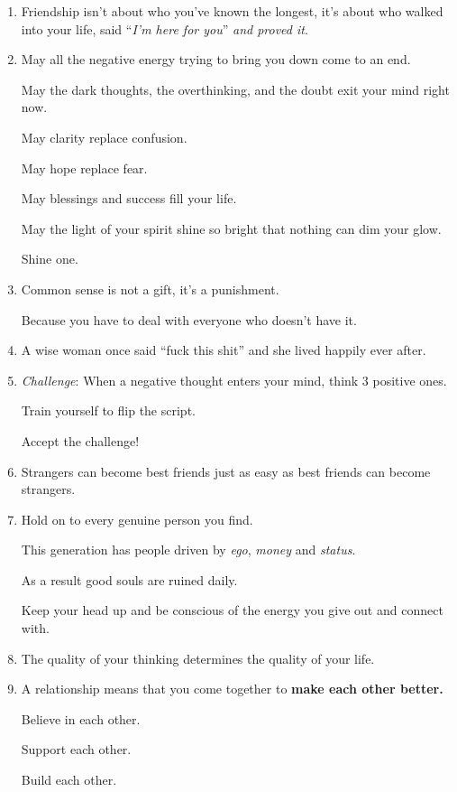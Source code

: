 \documentclass{article}
\numberwithin{equation}{section}
\begin{document}
\begin{enumerate}
    \textit{You'll make sacrifices}.'' - R. Solo
    \item Friendship isn't about who you've known the longest, it's about who walked into your life, said ``\textit{I'm here for you}'' \textit{and proved it}.
    \item  May all the negative energy trying to bring you down come to an end.
    
    May the dark thoughts, the overthinking, and the doubt exit your mind right now.
    
    May clarity replace confusion.
    
    May hope replace fear.
    
    May blessings and success fill your life.
    
    May the light of your spirit shine so bright that nothing can dim your glow.
    
    Shine one.
    \item Common sense is not a gift, it's a punishment.
    
    Because you have to deal with everyone who doesn't have it.
    \item A wise woman once said ``fuck this shit'' and she lived happily ever after.
    \item \textit{Challenge}: When a negative thought enters your mind, think 3 positive ones.
    
    Train yourself to flip the script.
    
    Accept the challenge!
    \item Strangers can become best friends just as easy as best friends can become strangers.
    \item Hold on to every genuine person you find.
    
    This generation has people driven by \textit{ego}, \textit{money} and \textit{status}.
    
    As a result good souls are ruined daily.
    
    Keep your head up and be conscious of the energy you give out and connect with.
    \item The quality of your thinking determines the quality of your life.
    \item A relationship means that you come together to \textbf{make each other better.}
    
    Believe in each other.
    
    Support each other.
    
    Build each other.
    

\end{enumerate}
\end{document}
